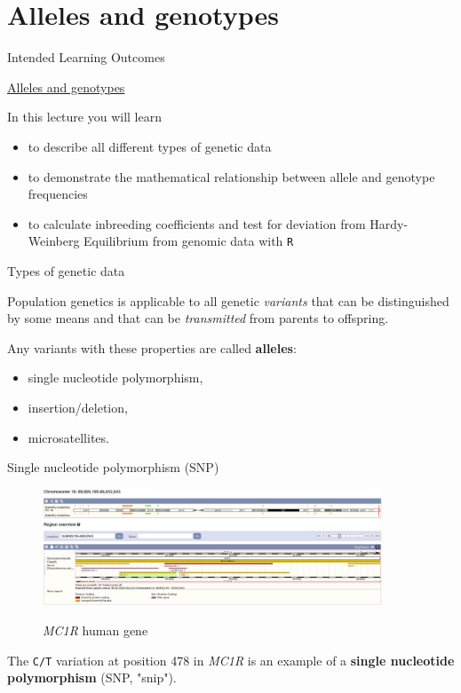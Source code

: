 
\section{Alleles and genotypes}

\begin{frame}{Intended Learning Outcomes}

	\underline{Alleles and genotypes}

	\bigskip

        In this lecture you will learn
        \begin{itemize}
                \item to describe all different types of genetic data
                \item to demonstrate the mathematical relationship between allele and genotype frequencies
                \item to calculate inbreeding coefficients and test for deviation from Hardy-Weinberg Equilibrium from genomic data with \texttt{R}
        \end{itemize}

\end{frame}


\begin{frame}{Types of genetic data}

	Population genetics is applicable to all genetic \textit{variants} that can be distinguished by some means and that can be \textit{transmitted} from parents to offspring.

	\bigskip

	Any variants with these properties are called \textbf{alleles}:
	\begin{itemize}
		\item single nucleotide polymorphism,
		\item insertion/deletion,
		\item microsatellites.
	\end{itemize}

\end{frame}


\begin{frame}{Single nucleotide polymorphism (SNP)}

	\begin{figure}
        	\includegraphics[width=0.9\textwidth]{Pics/MC1R} \
                \caption{\textit{MC1R} human gene}
        \end{figure}

	The \texttt{C/T} variation at position 478 in \textit{MC1R} is an example of a \textbf{single nucleotide polymorphism} (SNP, "snip").

\end{frame}


